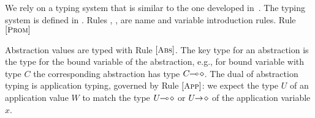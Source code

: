 %

\noi We rely on a typing system that is similar to the one developed in~\cite{tlca07,MostrousY15}. 
The typing system is defined in .
Rules , ,  are name and variable introduction rules. 
Rule ${\footnotesize[\textrm{\small \textsc{Prom}}]}$

Abstraction values are typed with Rule ${\footnotesize[\textrm{\small \textsc{Abs}}]}$.
The key type for an abstraction is the type for
the bound variable of the abstraction, e.g., for
bound variable with type $C$ the corresponding abstraction has type $C\!\! \multimap\! \diamond$.
The dual of abstraction typing is application typing,
governed by Rule ${\footnotesize[\textrm{\small \textsc{App}}]}$: we expect
the type $U$ of an application value $W$ 
to match the type $U\!\! \multimap\! \diamond$ or $U\!\! \rightarrow\! \diamond$
of the application variable $x$.

